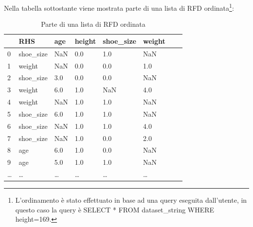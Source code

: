 Nella tabella sottostante viene mostrata parte di una lista di RFD ordinata\footnote{L'ordinamento è stato effettuato in base ad una query eseguita dall'utente, in questo caso la query è SELECT * FROM dataset{\_}string WHERE height=169.}:
\begin{table}[H]
    \centering
    \begin{tabular}{l l l l l l l l}
        & RHS & age & height & shoe{\_}size & weight \\
        \hline
    0 & shoe{\_}size & NaN & 0.0 & 1.0 & NaN \\
    1 & weight & NaN & 0.0 & 0.0 & 1.0 \\
    2 & shoe{\_}size & 3.0 & 0.0 & 0.0 & NaN \\
    3 & weight & 6.0 & 1.0 & NaN & 4.0 \\
    4 & weight & NaN & 1.0 & 1.0 & NaN \\
    5 & shoe{\_}size & 6.0 & 1.0 & 1.0 & NaN \\
    6 & shoe{\_}size & NaN & 1.0 & 1.0 & 4.0 \\
    7 & shoe{\_}size & NaN & 1.0 & 0.0 & 2.0 \\
    8 & age & 6.0 & 1.0 & 0.0 & NaN \\
    9 & age & 5.0 & 1.0 & 1.0 & NaN \\
    \ldots & \ldots & \ldots & \ldots & \ldots & \ldots \\
    \end{tabular}
    \caption{Parte di una lista di RFD ordinata}
    \label{tab:ord_rdf}
\end{table}

